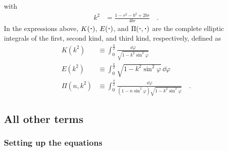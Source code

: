 \documentclass[modern]{aastex61}
\begin{document}
%
with
%
\begin{align}
    \label{eq:k2}
    k^2 &= \frac{1 - r^2 - b^2 + 2 b r}{4 b r}
    \quad.
\end{align}
%
In the expressions above, $K(\bigdot)$, $E(\bigdot)$, and $\Pi(\bigdot, \bigdot)$
are the complete elliptic integrals of the first, second kind, and third kind,
respectively, defined as
%
\begin{align}
    \label{eq:elliptic}
    K(k^2) &\equiv \int_0^{\frac{\pi}{2}} \frac{\dd \varphi}{\sqrt{1 - k^2 \sin^2 \varphi}}
    \nonumber \\[0.5em]
    E(k^2) &\equiv \int_0^{\frac{\pi}{2}} \sqrt{1 - k^2 \sin^2 \varphi} \, \dd \varphi
    \nonumber \\[0.5em]
    \Pi(n, k^2) &\equiv \int_0^{\frac{\pi}{2}} \frac{\dd \varphi}{(1 - n \sin^2 \varphi)\sqrt{1 - k^2 \sin^2 \varphi}}
    \quad.
\end{align}

\subsection{All other terms}
\label{sec:generalterm}

\subsubsection{Setting up the equations}
\label{sec:generaltermsetup}
\end{document}
